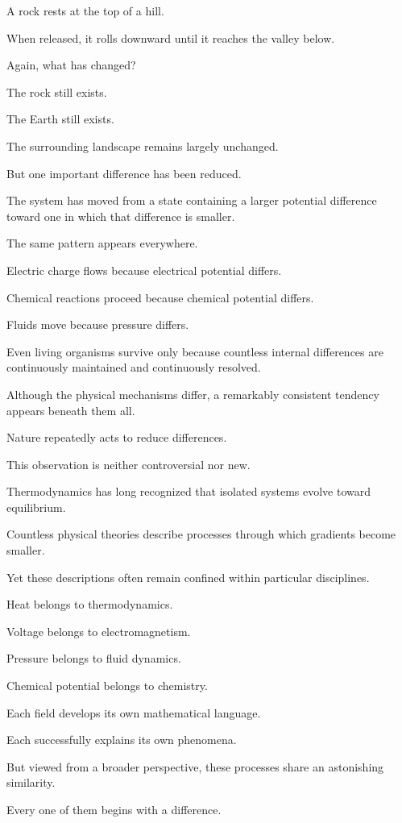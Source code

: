A rock rests at the top of a hill.

When released, it rolls downward until it reaches the valley below.

Again, what has changed?

The rock still exists.

The Earth still exists.

The surrounding landscape remains largely unchanged.

But one important difference has been reduced.

The system has moved from a state containing a larger potential difference toward one in which that difference is smaller.

The same pattern appears everywhere.

Electric charge flows because electrical potential differs.

Chemical reactions proceed because chemical potential differs.

Fluids move because pressure differs.

Even living organisms survive only because countless internal differences are continuously maintained and continuously resolved.

Although the physical mechanisms differ, a remarkably consistent tendency appears beneath them all.

Nature repeatedly acts to reduce differences.

This observation is neither controversial nor new.

Thermodynamics has long recognized that isolated systems evolve toward equilibrium.

Countless physical theories describe processes through which gradients become smaller.

Yet these descriptions often remain confined within particular disciplines.

Heat belongs to thermodynamics.

Voltage belongs to electromagnetism.

Pressure belongs to fluid dynamics.

Chemical potential belongs to chemistry.

Each field develops its own mathematical language.

Each successfully explains its own phenomena.

But viewed from a broader perspective, these processes share an astonishing similarity.

Every one of them begins with a difference.

